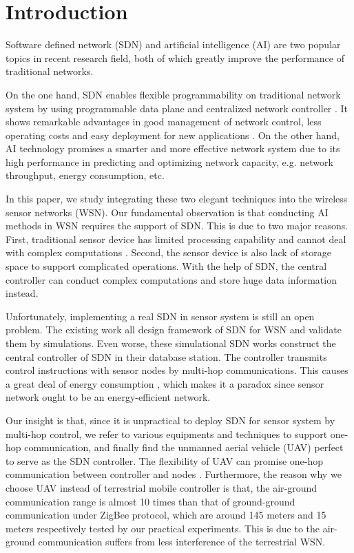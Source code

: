 \section{Introduction}




 
Software defined network (SDN) and artificial intelligence (AI) 
are two popular topics in recent research field, 
both of which greatly improve the performance of traditional
networks.
 
On the one hand, SDN enables flexible 
programmability on traditional network system 
by using programmable data plane and centralized network controller \cite{7122247}.
It shows remarkable advantages in good management of network control, 
less operating costs and easy deployment for new applications \cite{Feamster2014The}.
On the other hand, AI technology promises a smarter and more effective network system
due to its high performance in predicting and optimizing network capacity,
e.g. network throughput, energy consumption, etc.

In this paper, we study integrating these two elegant techniques into 
the wireless sensor networks (WSN). Our fundamental observation is 
that conducting AI methods in WSN requires
the support of SDN. This is due to two major reasons. 
First, traditional sensor device 
has limited processing capability and cannot deal with complex computations \cite{Sharma2012Security}.
Second, the sensor device is also lack of storage space 
to support complicated operations. With the help of SDN, 
the central controller can conduct complex computations 
and store huge data information instead.
  
Unfortunately, implementing a real SDN in sensor system 
is still an open problem. The existing work 
 \cite{mahmud2011exploitation, costanzo2012software, luo2012sensor, de2015tinysdn, galluccio2015sdn} 
all design framework of SDN for WSN and validate them by simulations.  
Even worse, these simulational SDN works construct the central controller 
of SDN in their database station. The controller transmits control 
instructions with sensor nodes by multi-hop communications.
This causes a great deal of energy consumption \cite{Yang2014}, which 
makes it a paradox since sensor network ought to be an energy-efficient network.

Our insight is that, since it is unpractical to deploy SDN 
for sensor system by multi-hop control,
we refer to various equipments and techniques to support one-hop communication, 
and finally find the unmanned aerial vehicle (UAV) 
perfect to serve as the SDN controller. The flexibility
of UAV can promise one-hop communication between controller
and nodes \cite{Sara2016a}. Furthermore, the reason why we choose UAV instead of
terrestrial mobile controller is that, the air-ground communication range
is almost 10 times than that of ground-ground communication under ZigBee protocol, which are
around 145 meters and 15 meters respectively tested by our practical experiments.
This is due to the air-ground communication suffers from less interference of the terrestrial WSN.
 

